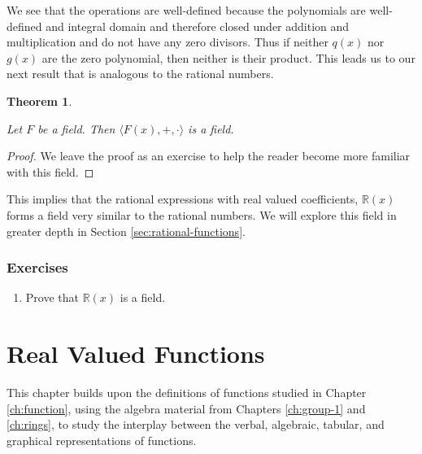 \documentclass[
]{book}
\providecommand{\tightlist}{%
  \setlength{\itemsep}{0pt}\setlength{\parskip}{0pt}}
\newtheorem{theorem}{Theorem}[chapter]
\theoremstyle{definition}
\theoremstyle{definition}
\theoremstyle{definition}
\theoremstyle{definition}
\theoremstyle{remark}
\begin{document}
We see that the operations are well-defined because the polynomials are well-defined and integral domain and therefore closed under addition and multiplication and do not have any zero divisors. Thus if neither \(q(x)\) nor \(g(x)\) are the zero polynomial, then neither is their product. This leads us to our next result that is analogous to the rational numbers.

\begin{theorem}
\protect\hypertarget{thm:unlabeled-div-129}{}\label{thm:unlabeled-div-129}

Let \(F\) be a field. Then \(\langle F(x),+,\cdot \rangle\) is a field.

\end{theorem}

\begin{proof}

We leave the proof as an exercise to help the reader become more familiar with this field.

\end{proof}

This implies that the rational expressions with real valued coefficients, \(\mathbb{R}(x)\) forms a field very similar to the rational numbers. We will explore this field in greater depth in Section \ref{sec:rational-functions}.

\hypertarget{exercises-26}{%
\subsection{Exercises}\label{exercises-26}}

\begin{enumerate}
\def\labelenumi{\arabic{enumi}.}
\tightlist
\item
  Prove that \(\mathbb{R}(x)\) is a field.
\end{enumerate}

\hypertarget{ch:real-valued-functions}{%
\chapter{Real Valued Functions}\label{ch:real-valued-functions}}

This chapter builds upon the definitions of functions studied in Chapter \ref{ch:function}, using the algebra material from Chapters \ref{ch:group-1} and \ref{ch:rings}, to study the interplay between the verbal, algebraic, tabular, and graphical representations of functions.
\end{document}
